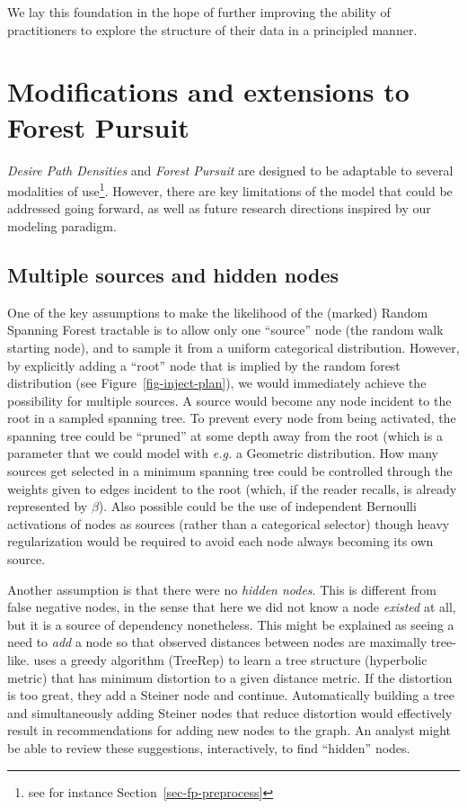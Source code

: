 \documentclass[%
	12pt,
		oneside,
		letterpaper
]{book}
\begin{document}
We lay this foundation in the hope of further improving the ability of
practitioners to explore the structure of their data in a principled
manner.

\section{Modifications and extensions to Forest
Pursuit}\label{sec-future-fp}

\emph{Desire Path Densities} and \emph{Forest Pursuit} are designed to
be adaptable to several modalities of use\footnote{see for instance
  Section~\ref{sec-fp-preprocess}}. However, there are key limitations
of the model that could be addressed going forward, as well as future
research directions inspired by our modeling paradigm.

\subsection{Multiple sources and hidden
nodes}\label{multiple-sources-and-hidden-nodes}

One of the key assumptions to make the likelihood of the (marked) Random
Spanning Forest tractable is to allow only one ``source'' node (the
random walk starting node), and to sample it from a uniform categorical
distribution. However, by explicitly adding a ``root'' node that is
implied by the random forest distribution (see
Figure~\ref{fig-inject-plan}), we would immediately achieve the
possibility for multiple sources. A source would become any node
incident to the root in a sampled spanning tree. To prevent every node
from being activated, the spanning tree could be ``pruned'' at some
depth away from the root (which is a parameter that we could model with
\emph{e.g.} a Geometric distribution. How many sources get selected in a
minimum spanning tree could be controlled through the weights given to
edges incident to the root (which, if the reader recalls, is already
represented by \(\beta\)). Also possible could be the use of independent
Bernoulli activations of nodes as sources (rather than a categorical
selector) though heavy regularization would be required to avoid each
node always becoming its own source.

Another assumption is that there were no \emph{hidden nodes}. This is
different from false negative nodes, in the sense that here we did not
know a node \emph{existed} at all, but it is a source of dependency
nonetheless. This might be explained as seeing a need to \emph{add} a
node so that observed distances between nodes are maximally tree-like.
\autocite{TreeIam_Sonthalia2020} uses a greedy algorithm (TreeRep) to
learn a tree structure (hyperbolic metric) that has minimum distortion
to a given distance metric. If the distortion is too great, they add a
Steiner node and continue. Automatically building a tree and
simultaneously adding Steiner nodes that reduce distortion would
effectively result in recommendations for adding new nodes to the graph.
An analyst might be able to review these suggestions, interactively, to
find ``hidden'' nodes.
\end{document}
